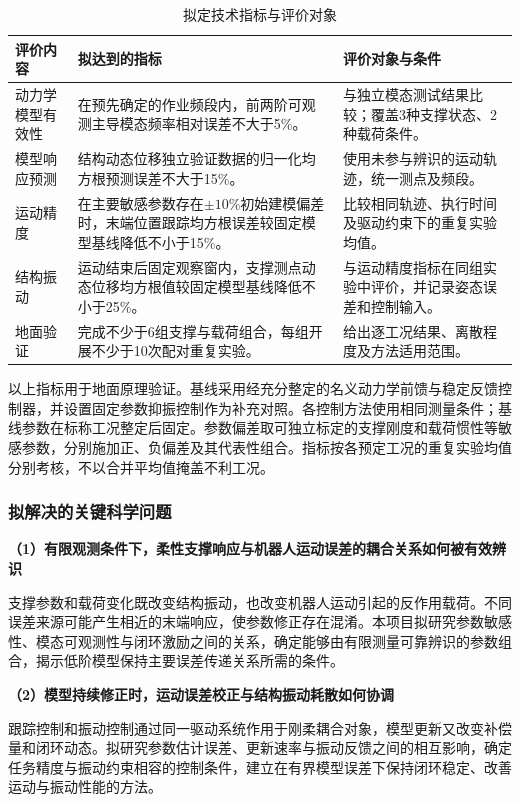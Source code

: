\documentclass[UTF8,a4paper,zihao=-4,fontset=fandol]{ctexart}
\newcommand{\topic}[1]{\par\addvspace{0.5em}\noindent\textbf{#1}\par\nobreak}
\begin{document}
\begin{table}[htbp]
\centering
\caption{拟定技术指标与评价对象}
\label{tab:targets}
\small
\begin{tabularx}{\linewidth}{P{2.65cm}YP{3.7cm}}
\toprule
评价内容 & 拟达到的指标 & 评价对象与条件 \\
\midrule
动力学模型有效性 & 在预先确定的作业频段内，前两阶可观测主导模态频率相对误差不大于5\%。 & 与独立模态测试结果比较；覆盖3种支撑状态、2种载荷条件。 \\
模型响应预测 & 结构动态位移独立验证数据的归一化均方根预测误差不大于15\%。 & 使用未参与辨识的运动轨迹，统一测点及频段。 \\
运动精度 & 在主要敏感参数存在$\pm10\%$初始建模偏差时，末端位置跟踪均方根误差较固定模型基线降低不小于15\%。 & 比较相同轨迹、执行时间及驱动约束下的重复实验均值。 \\
结构振动 & 运动结束后固定观察窗内，支撑测点动态位移均方根值较固定模型基线降低不小于25\%。 & 与运动精度指标在同组实验中评价，并记录姿态误差和控制输入。 \\
地面验证 & 完成不少于6组支撑与载荷组合，每组开展不少于10次配对重复实验。 & 给出逐工况结果、离散程度及方法适用范围。 \\
\bottomrule
\end{tabularx}
\end{table}

以上指标用于地面原理验证。基线采用经充分整定的名义动力学前馈与稳定反馈控制器，并设置固定参数抑振控制作为补充对照。各控制方法使用相同测量条件；基线参数在标称工况整定后固定。参数偏差取可独立标定的支撑刚度和载荷惯性等敏感参数，分别施加正、负偏差及其代表性组合。指标按各预定工况的重复实验均值分别考核，不以合并平均值掩盖不利工况。

\subsubsection{拟解决的关键科学问题}

\topic{（1）有限观测条件下，柔性支撑响应与机器人运动误差的耦合关系如何被有效辨识}

支撑参数和载荷变化既改变结构振动，也改变机器人运动引起的反作用载荷。不同误差来源可能产生相近的末端响应，使参数修正存在混淆。本项目拟研究参数敏感性、模态可观测性与闭环激励之间的关系，确定能够由有限测量可靠辨识的参数组合，揭示低阶模型保持主要误差传递关系所需的条件。

\topic{（2）模型持续修正时，运动误差校正与结构振动耗散如何协调}

跟踪控制和振动控制通过同一驱动系统作用于刚柔耦合对象，模型更新又改变补偿量和闭环动态。拟研究参数估计误差、更新速率与振动反馈之间的相互影响，确定任务精度与振动约束相容的控制条件，建立在有界模型误差下保持闭环稳定、改善运动与振动性能的方法。
\end{document}
